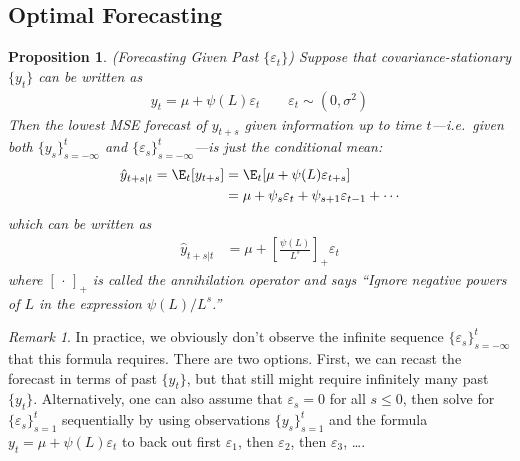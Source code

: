 \documentclass[12pt]{article}
\theoremstyle{plain}
\newtheorem{prop}[thm]{Proposition}
\theoremstyle{definition}
\theoremstyle{remark}
\newtheorem*{rmk}{Remark}
\begin{document}
\clearpage
\subsection{Optimal Forecasting}

\begin{prop}\emph{(Forecasting Given Past $\{\varepsilon_t\}$)}
Suppose that covariance-stationary $\{y_t\}$ can be written as
\begin{align*}
  y_t = \mu + \psi(L)\varepsilon_t
  \qquad \varepsilon_t \sim (0,\sigma^2)
\end{align*}
Then the lowest MSE forecast of $y_{t+s}$ given information up to time
$t$---i.e.\ given both $\{y_s\}_{s=-\infty}^t$ and
$\{\varepsilon_s\}_{s=-\infty}^t$---is just the conditional mean:
\begin{align*}
  \hat{y}_{t+s|t}
  = \E_t[y_{t+s}]
  &= \E_t[\mu + \psi(L)\varepsilon_{t+s}] \\
  &= \mu + \psi_s\varepsilon_t + \psi_{s+1}\varepsilon_{t-1} + \cdots
\end{align*}
which can be written as
\begin{align}
  \hat{y}_{t+s|t}
  &= \mu + \left[\frac{\psi(L)}{L^s}\right]_+\varepsilon_t
  \label{optforeeps}
\end{align}
where $[\,\cdot\,]_+$ is called the \emph{annihilation operator} and
says ``Ignore negative powers of $L$ in the expression $\psi(L)/L^s$.''
\end{prop}
\begin{rmk}
In practice, we obviously don't observe the infinite sequence
$\{\varepsilon_s\}_{s=-\infty}^t$ that this formula requires. There are
two options. First, we can recast the forecast in terms of past
$\{y_t\}$, but that still might require infinitely many past $\{y_t\}$.
Alternatively, one can also assume that $\varepsilon_s=0$ for all
$s\leq 0$, then solve for $\{\varepsilon_s\}_{s=1}^t$ sequentially by using
observations $\{y_s\}_{s=1}^t$ and the formula
$y_t = \mu + \psi(L)\varepsilon_t$ to back out first $\varepsilon_1$,
then $\varepsilon_2$, then $\varepsilon_3$, \ldots.
\end{rmk}
\end{document}
